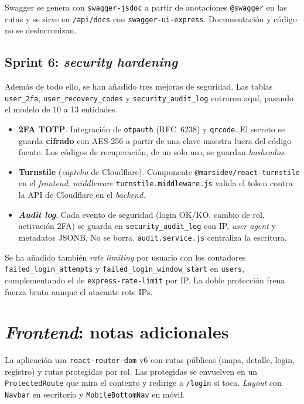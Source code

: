 Swagger se genera con \texttt{swagger-jsdoc} a partir de anotaciones \texttt{@swagger} en las rutas y se sirve en \texttt{/api/docs} con \texttt{swagger-ui-express}. Documentación y código no se desincronizan.


\subsection{Sprint 6: \textit{security hardening}}

Además de todo ello, se han añadido tres mejoras de seguridad. Las tablas \texttt{user\_2fa}, \texttt{user\_recovery\_codes} y \texttt{security\_audit\_log} entraron aquí, pasando el modelo de 10 a 13 entidades.

\begin{itemize}
  \item \textbf{2FA TOTP}. Integración de \texttt{otpauth} (RFC~6238) y \texttt{qrcode}. El secreto se guarda \textbf{cifrado} con AES-256 a partir de una clave maestra fuera del código fuente. Los códigos de recuperación, de un solo uso, se guardan \textit{hasheados}.
  \item \textbf{Turnstile} (\textit{captcha} de Cloudflare). Componente \texttt{@marsidev/react-turnstile} en el \textit{frontend}; \textit{middleware} \texttt{turnstile.middleware.js} valida el token contra la API de Cloudflare en el \textit{backend}.
  \item \textbf{\textit{Audit log}}. Cada evento de seguridad (login OK/KO, cambio de rol, activación 2FA) se guarda en \texttt{security\_audit\_log} con IP, \textit{user agent} y metadatos JSONB. No se borra. \texttt{audit.service.js} centraliza la escritura.
\end{itemize}

Se ha añadido también \textit{rate limiting} por usuario con los contadores \texttt{failed\_login\_attempts} y \texttt{failed\_login\_window\_start} en \texttt{users}, complementando el de \texttt{express-rate-limit} por IP. La doble protección frena fuerza bruta aunque el atacante rote IPs.


\section{\textit{Frontend}: notas adicionales}
\label{sec:frontend-destacados}

La aplicación usa \texttt{react-router-dom} v6 con rutas públicas (mapa, detalle, login, registro) y rutas protegidas por rol. Las protegidas se envuelven en un \texttt{ProtectedRoute} que mira el contexto y redirige a \texttt{/login} si toca. \textit{Layout} con \texttt{Navbar} en escritorio y \texttt{MobileBottomNav} en móvil.

